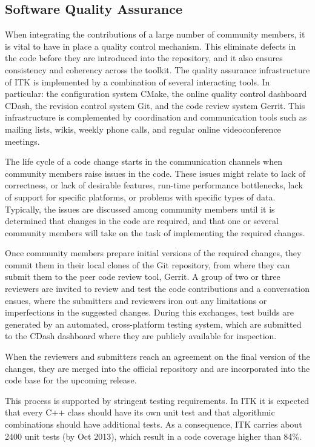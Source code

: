 \documentclass{frontiersENG} %
\begin{document}
\subsection{Software Quality Assurance}

When integrating the contributions of a large number of community members, it
is vital to have in place a quality control mechanism. This eliminate defects
in the code before they are introduced into the repository, and it also ensures
consistency and coherency across the toolkit.  The quality assurance
infrastructure of ITK is implemented by a combination of several interacting
tools. In particular: the configuration system CMake, the online quality
control dashboard CDash, the revision control system Git, and the code review
system Gerrit. This infrastructure is complemented by coordination and
communication tools such as mailing lists, wikis, weekly phone calls, and
regular online videoconference meetings.

The life cycle of a code change starts in the communication channels when
community members raise issues in the code. These issues might relate to lack
of correctness, or lack of desirable features, run-time performance
bottlenecks, lack of support for specific platforms, or problems with specific
types of data. Typically, the issues are discussed among community members
until it is determined that changes in the code are required, and that one or
several community members will take on the task of implementing the required
changes.

Once community members prepare initial versions of the required changes, they
commit them in their local clones of the Git repository, from where they can
submit them to the peer code review tool, Gerrit. A group of two or three
reviewers are invited to review and test the code contributions and a
conversation ensues, where the submitters and reviewers iron out any
limitations or imperfections in the suggested changes. During this exchanges,
test builds are generated by an automated, cross-platform testing system, which
are submitted to the CDash dashboard where they are publicly available for
inspection.

When the reviewers and submitters reach an agreement on the final version of
the changes, they are merged into the official repository and are incorporated
into the code base for the upcoming release.

This process is supported by stringent testing requirements. In ITK it is
expected that every C++ class should have its own unit test and that
algorithmic combinations should have additional tests. As a consequence, ITK
carries about 2400 unit tests (by Oct 2013), which result in a code coverage
higher than 84\%.
\end{document}
